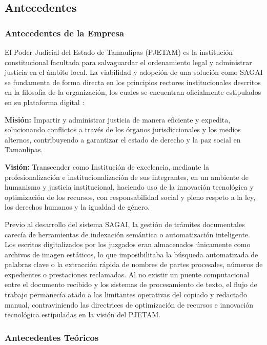 \subsection{Antecedentes}
\label{sec:antecedentes}

\subsubsection{Antecedentes de la Empresa}
\label{subsec:antecedentes_empresa}

El Poder Judicial del Estado de Tamaulipas (PJETAM) es la institución constitucional facultada para salvaguardar el ordenamiento legal y administrar justicia en el ámbito local. La viabilidad y adopción de una solución como SAGAI se fundamenta de forma directa en los principios rectores institucionales descritos en la filosofía de la organización, los cuales se encuentran oficialmente estipulados en su plataforma digital \cite{pjetamMision}:

\textbf{Misión:} Impartir y administrar justicia de manera eficiente y expedita, solucionando conflictos a través de los órganos jurisdiccionales y los medios alternos, contribuyendo a garantizar el estado de derecho y la paz social en Tamaulipas.

\textbf{Visión:} Transcender como Institución de excelencia, mediante la profesionalización e institucionalización de sus integrantes, en un ambiente de humanismo y justicia institucional, haciendo uso de la innovación tecnológica y optimización de los recursos, con responsabilidad social y pleno respeto a la ley, los derechos humanos y la igualdad de género.

Previo al desarrollo del sistema SAGAI, la gestión de trámites documentales carecía de herramientas de indexación semántica o automatización inteligente. Los escritos digitalizados por los juzgados eran almacenados únicamente como archivos de imagen estáticos, lo que imposibilitaba la búsqueda automatizada de palabras clave o la extracción rápida de nombres de partes procesales, números de expedientes o prestaciones reclamadas. Al no existir un puente computacional entre el documento recibido y los sistemas de procesamiento de texto, el flujo de trabajo permanecía atado a las limitantes operativas del copiado y redactado manual, contraviniendo las directrices de optimización de recursos e innovación tecnológica estipuladas en la visión del PJETAM.

\subsubsection{Antecedentes Teóricos}
\label{subsec:antecedentes_teoricos}

